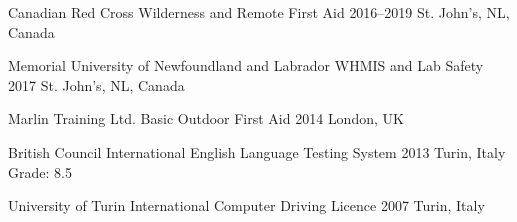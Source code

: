 

\begin{cventries}

  \cventry
    {Canadian Red Cross} %
    {Wilderness and Remote First Aid} %
    {2016--2019} %
    {St. John's, NL, Canada} %
    {
    }

  \cventry
    {Memorial University of Newfoundland and Labrador} %
    {WHMIS and Lab Safety} %
    {2017} %
    {St. John's, NL, Canada} %
    {
    }

  \cventry
    {Marlin Training Ltd.} %
    {Basic Outdoor First Aid} %
    {2014} %
    {London, UK} %
    {
    }

  \cventry
    {British Council} %
    {International English Language Testing System} %
    {2013} %
    {Turin, Italy} %
    {
      Grade: 8.5
    }

  \cventry
    {University of Turin} %
    {International Computer Driving Licence} %
    {2007} %
    {Turin, Italy} %
    {
    }

\end{cventries}
